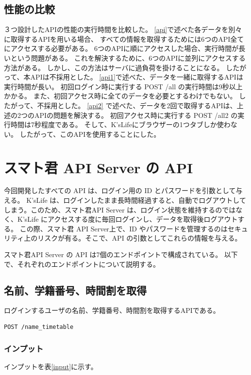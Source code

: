 \documentclass[a4j,12pt,onecolumn,oneside,titlepage,openany,final]{jreport}
\begin{document}
\subsection{性能の比較}


３つ設計したAPIの性能の実行時間を比較した。
\ref{api}で述べた各データを別々に取得するAPIを用いる場合、
すべての情報を取得するためには6つのAPI全てにアクセスする必要がある。
6つのAPIに順にアクセスした場合、実行時間が長いという問題がある。
これを解決するために、6つのAPIに並列にアクセスする方法がある。
しかし、この方法はサーバに過負荷を掛けることになる。
したがって、本APIは不採用とした。
\ref{api1}で述べた、データを一緒に取得するAPIは実行時間が長い。
初回ログイン時に実行する POST /all の実行時間は9秒以上かかる。
また、初回アクセス時に全てのデータを必要とするわけでもない。
したがって、不採用とした。
\ref{api2} で述べた、データを2回で取得するAPIは、上述の2つのAPIの問題を解決する。
初回アクセス時に実行する POST /all2 の実行時間は7秒程度である。
そして、K'sLifeにブラウザーの1つタブしか使わない。
したがって、このAPIを使用することにした。



\section{スマト君 API Server の API}\label{rihabiri_jisso}
今回開発したすべての API は、ログイン用の ID とパスワードを引数として与える。
K'sLife は、ログインしたまま長時間経過すると、自動でログアウトしてしまう。このため、スマト君API Server は、ログイン状態を維持するのではなく、K'sLife にアクセスする度に毎回ログインし、データを取得後ログアウトする。
この際、スマト君 API Server上で、ID やパスワードを管理するのはセキュリティ上のリスクが有る。そこで、API の引数としてこれらの情報を与える。

スマト君API Server の API は7個のエンドポイントで構成されている。
以下で、それぞれのエンドポイントについて説明する。
\subsection{名前、学籍番号、時間割を取得}
ログインするユーザの名前、学籍番号、時間割を取得するAPIである。
\begin{lstlisting}[language=http, firstnumber=1]
POST /name_timetable
\end{lstlisting}

\subsubsection{インプット}
インプットを表\ref{input}に示す。
\end{document}
